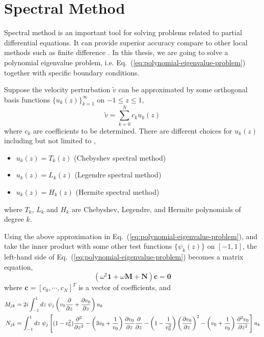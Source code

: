 \chapter{Spectral Method} \label{chap:spectral-method}
Spectral method is an important tool for solving problems related to partial differential equations. It can provide superior accuracy compare to other local methods such as finite difference \cite{shen_tang_etal_spectral_2011}. In this thesis, we are going to solve a polynomial eigenvalue problem, i.e. Eq.~(\ref{eq:polynomial-eigenvalue-problem}) together with specific boundary conditions.

Suppose the velocity perturbation $\tilde{v}$ can be approximated by some orthogonal basis functions $\{u_k(z)\}_{k=1}^{\infty}$ on $-1\leq z\leq 1$,
\begin{equation}
	\tilde{v} = \sum_{k=0}^{N} c_ku_k(z)
\end{equation}
where $c_k$ are coefficients to be determined. There are different choices for $u_k(z)$ including but not limited to \cite{shen_tang_etal_spectral_2011},
\begin{itemize}
	\item $u_k(z)=T_k(z)$ (Chebyshev spectral method)
	\item $u_k(z)=L_k(z)$ (Legendre spectral method)
	\item $u_k(z)=H_k(z)$ (Hermite spectral method)
\end{itemize}
where $T_k$, $L_k$ and $H_k$ are Chebyshev, Legendre, and Hermite polynomials of degree $k$.

Using the above approximation in Eq.~(\ref{eq:polynomial-eigenvalue-problem}), and take the inner product with some other test functions $\{\psi_k(z)\}$ on $[-1,1]$, the left-hand side of Eq.~(\ref{eq:polynomial-eigenvalue-problem}) becomes a matrix equation,
\begin{equation}
	(\omega^2\mathbf{1} + \omega\mathbf{M} + \mathbf{N})\mathbf{c} = \mathbf{0}
	\label{eq:pep-matrix-equation}
\end{equation}
where $\mathbf{c} = [c_0, \cdots, c_N]^T$ is a vector of coefficients, and
\begin{align}
	M_{jk} & = 2i\int_{-1}^{1}dz \; \psi_{j}\left(v_0\pdv{}{z} +\pdv{v_0}{z} \right)u_{k}
	\label{eq:operator-matrix-M}                                                          \\
	N_{jk} & = \int_{-1}^{1}dz \; \psi_{j} \left[(1-v_0^2)\pdv[2]{}{z}
		-\left(3v_0 + \frac{1}{v_0}\right)\pdv{v_0}{z}\pdv{}{z}
		- \left(1-\frac{1}{v_0^2}\right)\left(\pdv{v_0}{z}\right)^2
		- \left(v_0+\frac{1}{v_0}\right)\pdv[2]{v_0}{z}\right] u_{k}
	\label{eq:operator-matrix-N}
\end{align}

